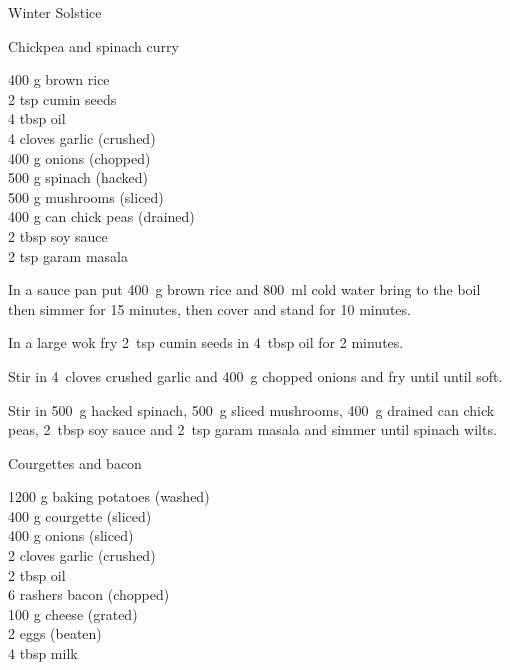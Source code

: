 \begin{menu}{Winter Solstice}
    \begin{recipe}{2}{Chickpea and spinach curry}%
    
		\begin{ingredients}
		400 g brown rice  \\
	2 tsp cumin seeds  \\
	4 tbsp oil  \\
	4 cloves garlic (crushed) \\
	400 g onions (chopped) \\
	500 g spinach (hacked) \\
	500 g mushrooms (sliced) \\
	400 g can chick peas (drained) \\
	2 tbsp soy sauce  \\
	2 tsp garam masala  \\
	
		\end{ingredients}
	
	
    \begin{instructions}
    \item 
      In a
      sauce pan
      put
      400~g  brown rice
      and
      800~ml  cold water
      bring to the boil then simmer for 15 minutes,
      then cover and stand for 10 minutes.
    \item 
        In a large wok fry
        2~tsp  cumin seeds
        in
        4~tbsp  oil
        for 2 minutes.
      \item 
        Stir in
        4~cloves crushed garlic
        and
        400~g chopped onions
        and fry until until soft.
      \item 
        Stir in
        500~g hacked spinach,
        500~g sliced mushrooms,
        400~g drained can chick peas,
        2~tbsp  soy sauce
        and
        2~tsp  garam masala
        and simmer until spinach wilts.
      
    \end{instructions}
    \end{recipe}%
  
    \begin{recipe}{2}{Courgettes and bacon}%
    
		\begin{ingredients}
		1200 g baking potatoes (washed) \\
	400 g courgette (sliced) \\
	400 g onions (sliced) \\
	2 cloves garlic (crushed) \\
	2 tbsp oil  \\
	6 rashers bacon (chopped) \\
	100 g cheese (grated) \\
	2  eggs (beaten) \\
	4 tbsp milk  \\
	

\end{ingredients}
\end{recipe}
\end{menu}
